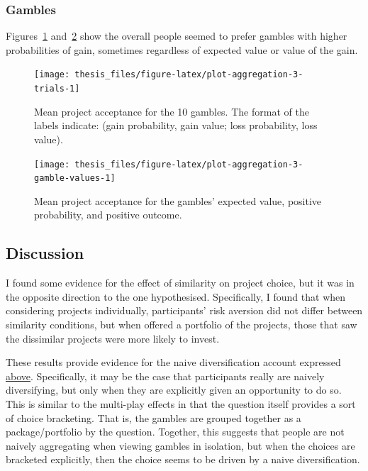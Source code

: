 \documentclass[a4paper, nobind, dvipsnames]{templates/ociamthesis}
\theoremstyle{definition}
\theoremstyle{definition}
\theoremstyle{definition}
\theoremstyle{definition}
\theoremstyle{remark}
\begin{document}
\subsubsection{Gambles}

Figures~\ref{fig:plot-aggregation-3-trials}
and~\ref{fig:plot-aggregation-3-gamble-values} show the
overall people seemed to prefer gambles with higher probabilities of gain,
sometimes regardless of expected value or value of the gain.



\begin{figure}
\texttt{[image: thesis\_files/figure-latex/plot-aggregation-3-trials-1]} \caption{Mean project acceptance for the 10 gambles. The format of the labels indicate: (gain probability, gain value; loss probability, loss value).}\label{fig:plot-aggregation-3-trials}
\end{figure}




\begin{figure}
\texttt{[image: thesis\_files/figure-latex/plot-aggregation-3-gamble-values-1]} \caption{Mean project acceptance for the gambles'
expected value, positive probability, and positive outcome.}\label{fig:plot-aggregation-3-gamble-values}
\end{figure}

\subsection{Discussion}

I found some evidence for the effect of similarity on project choice, but it was
in the opposite direction to the one hypothesised. Specifically, I found that
when considering projects individually, participants' risk aversion did not
differ between similarity conditions, but when offered a portfolio of the
projects, those that saw the dissimilar projects were more likely to invest.

These results provide evidence for the naive diversification account expressed
\protect\hyperlink{similarity-discussion-aggregation-1}{above}. Specifically, it may be the case
that participants really are naively diversifying, but only when they are
explicitly given an opportunity to do so. This is similar to the multi-play
effects in that the question itself provides a sort of choice bracketing. That
is, the gambles are grouped together as a package/portfolio by the question.
Together, this suggests that people are not naively aggregating when viewing
gambles in isolation, but when the choices are bracketed explicitly, then the
choice seems to be driven by a naive diversification.
\end{document}

